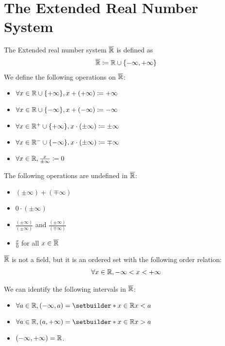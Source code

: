 \section{The Extended Real Number System}

The Extended real number system $\overline{\R}$ is defined as
\[
\overline{\R} \coloneqq \R \cup \set*{- \infty, + \infty}
\]
We define the following operations on $\overline{\R}$:
\begin{itemize}
    \item $\forall x \in \R \cup \set*{+ \infty}, x + (+ \infty) \coloneqq + \infty$
    \item $\forall x \in \R \cup \set*{- \infty}, x + (- \infty) \coloneqq - \infty$
    \item $\forall x \in \R^{+} \cup \set*{+ \infty}, x \cdot (\pm \infty) \coloneqq \pm \infty$
    \item $\forall x \in \R^{-} \cup \set*{- \infty}, x \cdot (\pm \infty) \coloneqq \mp \infty$
    \item $\forall x \in \R, \frac{x}{\pm \infty} \coloneqq 0$
\end{itemize}
The following operations are undefined in $\overline{\R}$:
\begin{itemize}
    \item $(\pm \infty) + (\mp \infty)$
    \item $0 \cdot (\pm \infty)$
    \item $\frac{(\pm \infty)}{(\pm \infty)}$ and $\frac{(\pm \infty)}{(\mp \infty)}$
    \item $\frac{x}{0}$ for all $x \in \overline{\R}$
\end{itemize}
$\overline{\R}$ is not a field, but it is an ordered set with the following order relation:
\[
\forall x \in \R, - \infty < x < + \infty
\]

\bigskip

\begin{remark}
    We can identify the following intervals in $\overline{\R}$:
    \begin{itemize}
        \item $\forall a \in \R, (- \infty, a) = \setbuilder*{x \in \R}{x < a}$
        \item $\forall a \in \R, (a, + \infty) = \setbuilder*{x \in \R}{x > a}$
        \item $(- \infty, + \infty) = \R$.
    \end{itemize}
\end{remark}

\bigskip

